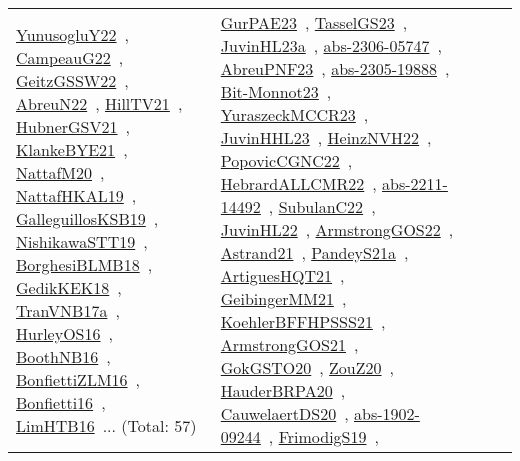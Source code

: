 {\begin{longtable}{lp{3cm}>{\raggedright\arraybackslash}p{6cm}>{\raggedright\arraybackslash}p{6cm}>{\raggedright\arraybackslash}p{8cm}}
\href{../works/YunusogluY22.pdf}{YunusogluY22}~\cite{YunusogluY22}, \href{../works/CampeauG22.pdf}{CampeauG22}~\cite{CampeauG22}, \href{../works/GeitzGSSW22.pdf}{GeitzGSSW22}~\cite{GeitzGSSW22}, \href{../works/AbreuN22.pdf}{AbreuN22}~\cite{AbreuN22}, \href{../works/HillTV21.pdf}{HillTV21}~\cite{HillTV21}, \href{../works/HubnerGSV21.pdf}{HubnerGSV21}~\cite{HubnerGSV21}, \href{../works/KlankeBYE21.pdf}{KlankeBYE21}~\cite{KlankeBYE21}, \href{../works/NattafM20.pdf}{NattafM20}~\cite{NattafM20}, \href{../works/NattafHKAL19.pdf}{NattafHKAL19}~\cite{NattafHKAL19}, \href{../works/GalleguillosKSB19.pdf}{GalleguillosKSB19}~\cite{GalleguillosKSB19}, \href{../works/NishikawaSTT19.pdf}{NishikawaSTT19}~\cite{NishikawaSTT19}, \href{../works/BorghesiBLMB18.pdf}{BorghesiBLMB18}~\cite{BorghesiBLMB18}, \href{../works/GedikKEK18.pdf}{GedikKEK18}~\cite{GedikKEK18}, \href{../works/TranVNB17a.pdf}{TranVNB17a}~\cite{TranVNB17a}, \href{../works/HurleyOS16.pdf}{HurleyOS16}~\cite{HurleyOS16}, \href{../works/BoothNB16.pdf}{BoothNB16}~\cite{BoothNB16}, \href{../works/BonfiettiZLM16.pdf}{BonfiettiZLM16}~\cite{BonfiettiZLM16}, \href{../works/Bonfietti16.pdf}{Bonfietti16}~\cite{Bonfietti16}, \href{../works/LimHTB16.pdf}{LimHTB16}~\cite{LimHTB16}... (Total: 57) & \href{../works/GurPAE23.pdf}{GurPAE23}~\cite{GurPAE23}, \href{../works/TasselGS23.pdf}{TasselGS23}~\cite{TasselGS23}, \href{../works/JuvinHL23a.pdf}{JuvinHL23a}~\cite{JuvinHL23a}, \href{../works/abs-2306-05747.pdf}{abs-2306-05747}~\cite{abs-2306-05747}, \href{../works/AbreuPNF23.pdf}{AbreuPNF23}~\cite{AbreuPNF23}, \href{../works/abs-2305-19888.pdf}{abs-2305-19888}~\cite{abs-2305-19888}, \href{../works/Bit-Monnot23.pdf}{Bit-Monnot23}~\cite{Bit-Monnot23}, \href{../works/YuraszeckMCCR23.pdf}{YuraszeckMCCR23}~\cite{YuraszeckMCCR23}, \href{../works/JuvinHHL23.pdf}{JuvinHHL23}~\cite{JuvinHHL23}, \href{../works/HeinzNVH22.pdf}{HeinzNVH22}~\cite{HeinzNVH22}, \href{../works/PopovicCGNC22.pdf}{PopovicCGNC22}~\cite{PopovicCGNC22}, \href{../works/HebrardALLCMR22.pdf}{HebrardALLCMR22}~\cite{HebrardALLCMR22}, \href{../works/abs-2211-14492.pdf}{abs-2211-14492}~\cite{abs-2211-14492}, \href{../works/SubulanC22.pdf}{SubulanC22}~\cite{SubulanC22}, \href{../works/JuvinHL22.pdf}{JuvinHL22}~\cite{JuvinHL22}, \href{../works/ArmstrongGOS22.pdf}{ArmstrongGOS22}~\cite{ArmstrongGOS22}, \href{../works/Astrand21.pdf}{Astrand21}~\cite{Astrand21}, \href{../works/PandeyS21a.pdf}{PandeyS21a}~\cite{PandeyS21a}, \href{../works/ArtiguesHQT21.pdf}{ArtiguesHQT21}~\cite{ArtiguesHQT21}, \href{../works/GeibingerMM21.pdf}{GeibingerMM21}~\cite{GeibingerMM21}, \href{../works/KoehlerBFFHPSSS21.pdf}{KoehlerBFFHPSSS21}~\cite{KoehlerBFFHPSSS21}, \href{../works/ArmstrongGOS21.pdf}{ArmstrongGOS21}~\cite{ArmstrongGOS21}, \href{../works/GokGSTO20.pdf}{GokGSTO20}~\cite{GokGSTO20}, \href{../works/ZouZ20.pdf}{ZouZ20}~\cite{ZouZ20}, \href{../works/HauderBRPA20.pdf}{HauderBRPA20}~\cite{HauderBRPA20}, \href{../works/CauwelaertDS20.pdf}{CauwelaertDS20}~\cite{CauwelaertDS20}, \href{../works/abs-1902-09244.pdf}{abs-1902-09244}~\cite{abs-1902-09244}, \href{../works/FrimodigS19.pdf}{FrimodigS19}~\cite{FrimodigS19}, 
\end{longtable}}
